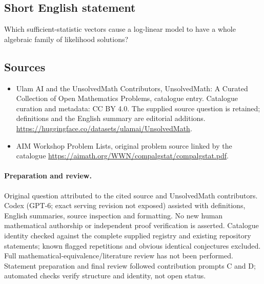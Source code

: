 \documentclass[11pt]{article}
\begin{document}
\subsection{Short English statement}
Which sufficient-statistic vectors cause a log-linear model to have a whole algebraic family of likelihood solutions?
\subsection{Sources}
\begin{itemize}
\item[\hypertarget{source:statement:1}{S1}] Ulam AI and the UnsolvedMath Contributors, UnsolvedMath: A Curated Collection of Open Mathematics Problems, catalogue entry. Catalogue curation and metadata: CC BY 4.0. The supplied source question is retained; definitions and the English summary are editorial additions.
\url{https://huggingface.co/datasets/ulamai/UnsolvedMath}.
\item[\hypertarget{source:statement:2}{S2}] AIM Workshop Problem Lists, original problem source linked by the catalogue
\url{https://aimath.org/WWN/compalgstat/compalgstat.pdf}.
\end{itemize}
\paragraph{Preparation and review.}
Original question attributed to the cited source and UnsolvedMath contributors. Codex (GPT-6; exact serving revision not exposed) assisted with definitions, English summaries, source inspection and formatting. No new human mathematical authorship or independent proof verification is asserted. Catalogue identity checked against the complete supplied registry and existing repository statements; known flagged repetitions and obvious identical conjectures excluded. Full mathematical-equivalence/literature review has not been performed. Statement preparation and final review followed contribution prompts C and D; automated checks verify structure and identity, not open status.
\label{end:statement}
\end{document}
